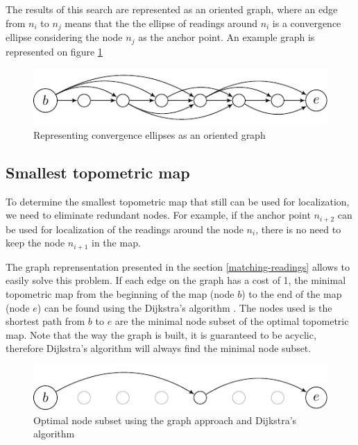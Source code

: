 \documentclass[letterpaper,10 pt,conference]{ieeeconf}
\begin{document}
The results of this search are represented as an oriented graph, where an edge from $n_{i}$ to $n_{j}$ means that the the ellipse of readings
around $n_{i}$ is a convergence ellipse considering the node $n_j$ as the anchor point. An example graph is represented on figure \ref{graph_unoptimized}


\begin{figure}[thpb]
  \centering
  \includegraphics[scale=1.0]{unoptimized-graph}
  \caption{Representing convergence ellipses as an oriented graph}
  \label{graph_unoptimized}
\end{figure}



\subsection{Smallest topometric map}
To determine the smallest topometric map that still can be used for localization, we need to eliminate redundant nodes.
For example, if the anchor point $n_{i+2}$ can be used for localization of the readings around the node $n_i$, there is no need to keep the node $n_{i+1}$
in the map.


The graph reprensentation presented in the section \ref{matching-readings} allows to easily solve this problem. If each edge
on the graph has a cost of 1, the minimal topometric map from the beginning of the map (node $b$) to the end of the map (node $e$)
can be found using the Dijkstra's algorithm \cite{dijkstra}. The nodes used
is the shortest path from $b$ to $e$ are the minimal node subset of the optimal topometric map. Note that the way the graph is built, it
is guaranteed to be acyclic, therefore Dijkstra's algorithm will always find the minimal node subset.


\begin{figure}[thpb]
  \centering
  \includegraphics[scale=1.0]{optimized-graph}
  \caption{Optimal node subset using the graph approach and Dijkstra's algorithm}
\end{figure}
\end{document}
